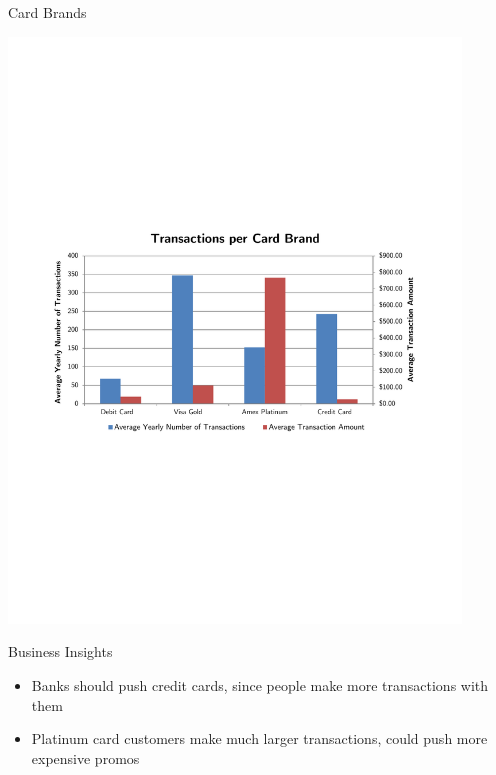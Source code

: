 \documentclass[xcolor=dvipsnames]{beamer}
\begin{document}
\begin{frame}[t]{Card Brands}
	\vspace{-6pt}
	\centerline{\includegraphics[width=0.9\textwidth]{brand-transactions}}
	\vspace{-8pt}
	\begin{block}{Business Insights}
		\footnotesize
		\begin{itemize}
			\item Banks should push credit cards, since people make more transactions with them
			\vspace{-4pt}
			\item Platinum card customers make much larger transactions, could push more expensive promos
		\end{itemize}
	\end{block}
\end{frame}

\end{document}
